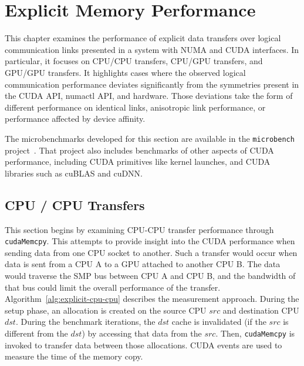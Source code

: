 \chapter{Explicit Memory Performance}
\label{ch:explicit}

This chapter examines the performance of explicit data transfers over logical communication links presented in a system with NUMA and CUDA interfaces.
In particular, it focuses on CPU/CPU transfers, CPU/GPU transfers, and GPU/GPU transfers.
It highlights cases where the observed logical communication performance deviates significantly from the symmetries present in the CUDA API, numactl API, and hardware.
Those deviations take the form of different performance on identical links, anisotropic link performance, or performance affected by device affinity.

The microbenchmarks developed for this section are available in the \texttt{microbench} project~\cite{pearson2018microbench}.
That project also includes benchmarks of other aspects of CUDA performance, including CUDA primitives like kernel launches, and CUDA libraries such as cuBLAS and cuDNN.

\section{CPU / CPU Transfers}
\label{sec:explicit-cpu-cpu}

This section begins by examining CPU-CPU transfer performance through \texttt{cudaMemcpy}.
This attempts to provide insight into the CUDA performance when sending data from one CPU socket to another.
Such a transfer would occur when data is sent from a CPU A to a GPU attached to another CPU B.
The data would traverse the SMP bus between CPU A and CPU B, and the bandwidth of that bus could limit the overall performance of the transfer.
Algorithm~\ref{alg:explicit-cpu-cpu} describes the measurement approach.
During the setup phase, an allocation is created on the source CPU $src$ and destination CPU $dst$.
During the benchmark iterations, the $dst$ cache is invalidated (if the $src$ is different from the $dst$) by accessing that data from the $src$.
Then, \texttt{cudaMemcpy} is invoked to transfer data between those allocations.
CUDA events are used to measure the time of the memory copy.

